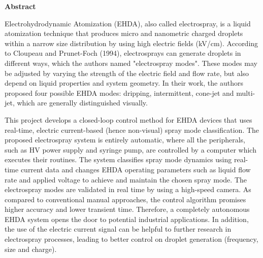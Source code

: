 
\begin{center}
\huge{{\bf Abstract}}
\vspace{2cm}
\end{center}

    Electrohydrodynamic Atomization (EHDA), also called electrospray, is a liquid atomization technique that
    produces micro and nanometric charged droplets within a narrow size distribution by using high electric fields (kV/cm).
    According to Cloupeau and Prunet-Foch\cite{prunet} (1994), electrosprays can generate droplets in different ways, which the authors
    named "electrospray modes". These modes may be adjusted by varying the strength of the electric field and flow rate,
    but also depend on liquid properties and system geometry. In their work, the authors proposed four possible EHDA
    modes: dripping, intermittent, cone-jet and multi-jet, which are generally distinguished visually.
    
    This project develops a closed-loop control method for EHDA devices that uses real-time, electric current-based (hence
    non-visual) spray mode classification.
    The proposed electrospray system is entirely automatic, where all the peripherals, such as HV power supply and syringe
    pump, are controlled by a computer which executes their routines.
    The system classifies spray mode dynamics using real-time current data and changes EHDA operating parameters such
    as liquid flow rate and applied voltage to achieve and maintain the chosen spray mode. The electrospray modes are
    validated in real time by using a high-speed camera.
    As compared to conventional manual approaches, the control algorithm promises higher
    accuracy and lower transient time. Therefore, a completely autonomous EHDA system opens the door to potential
    industrial applications. In addition, the use of the electric current signal can be helpful to further research in electrospray
    processes, leading to better control on droplet generation (frequency, size and charge).
 
